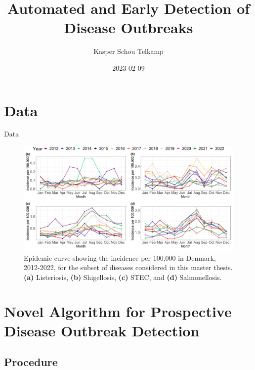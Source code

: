 \documentclass[aspectratio=169]{beamer}
\title[Automated and Early Detection of Disease Outbreaks]{Automated and
Early Detection of Disease Outbreaks}
\author{Kasper Schou Telkamp}
\institute{Section for Dynamical Systems}
\date{2023-02-09}
\begin{document}
\frame{
	\maketitle
}


\hypertarget{data}{%
\section{Data}\label{data}}

\begin{frame}{Data}
\tiny

\begin{figure}[H]
\includegraphics[width=0.7\linewidth]{../figures/EpiPlot} \caption{Epidemic curve showing the incidence per 100,000 in Denmark, 2012-2022, for the subset of diseases considered in this master thesis. \textbf{(a)} Listeriosis, \textbf{(b)} Shigellosis, \textbf{(c)} STEC, and \textbf{(d)} Salmonellosis.}\label{fig:EpiPlot}
\end{figure}

\normalsize
\end{frame}

\hypertarget{novel-algorithm-for-prospective-disease-outbreak-detection}{%
\section{Novel Algorithm for Prospective Disease Outbreak
Detection}\label{novel-algorithm-for-prospective-disease-outbreak-detection}}

\hypertarget{procedure}{%
\subsection{Procedure}\label{procedure}}
\end{document}
